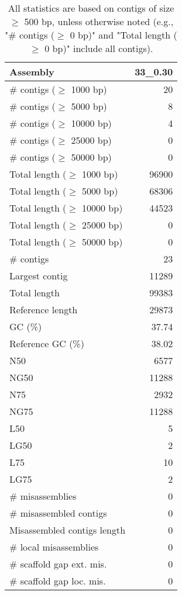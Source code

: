 \documentclass[12pt,a4paper]{article}
\begin{document}
\begin{table}[ht]
\begin{center}
\caption{All statistics are based on contigs of size $\geq$ 500 bp, unless otherwise noted (e.g., "\# contigs ($\geq$ 0 bp)" and "Total length ($\geq$ 0 bp)" include all contigs).}
\begin{tabular}{|l*{1}{|r}|}
\hline
Assembly & 33\_0.30 \\ \hline
\# contigs ($\geq$ 1000 bp) & 20 \\ \hline
\# contigs ($\geq$ 5000 bp) & 8 \\ \hline
\# contigs ($\geq$ 10000 bp) & 4 \\ \hline
\# contigs ($\geq$ 25000 bp) & 0 \\ \hline
\# contigs ($\geq$ 50000 bp) & 0 \\ \hline
Total length ($\geq$ 1000 bp) & 96900 \\ \hline
Total length ($\geq$ 5000 bp) & 68306 \\ \hline
Total length ($\geq$ 10000 bp) & 44523 \\ \hline
Total length ($\geq$ 25000 bp) & 0 \\ \hline
Total length ($\geq$ 50000 bp) & 0 \\ \hline
\# contigs & 23 \\ \hline
Largest contig & 11289 \\ \hline
Total length & 99383 \\ \hline
Reference length & 29873 \\ \hline
GC (\%) & 37.74 \\ \hline
Reference GC (\%) & 38.02 \\ \hline
N50 & 6577 \\ \hline
NG50 & 11288 \\ \hline
N75 & 2932 \\ \hline
NG75 & 11288 \\ \hline
L50 & 5 \\ \hline
LG50 & 2 \\ \hline
L75 & 10 \\ \hline
LG75 & 2 \\ \hline
\# misassemblies & 0 \\ \hline
\# misassembled contigs & 0 \\ \hline
Misassembled contigs length & 0 \\ \hline
\# local misassemblies & 0 \\ \hline
\# scaffold gap ext. mis. & 0 \\ \hline
\# scaffold gap loc. mis. & 0 \\ \hline

\end{tabular}
\end{center}
\end{table}
\end{document}
